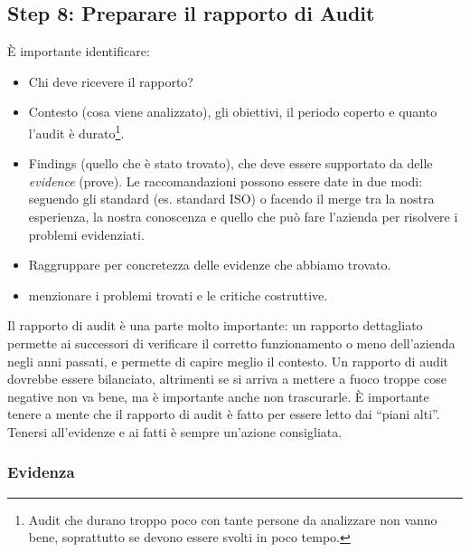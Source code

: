 \subsection{Step 8: Preparare il rapporto di Audit}

È importante identificare:
\begin{itemize}
\item Chi deve ricevere il rapporto?
\item Contesto (cosa viene analizzato), gli obiettivi, il periodo coperto e
quanto l'audit è durato\footnote{Audit che durano troppo poco con tante persone
da analizzare non vanno bene, soprattutto se devono essere svolti in poco
tempo.}.
\item Findings (quello che è stato trovato), che deve essere supportato da delle
\emph{evidence} (prove). Le raccomandazioni possono essere date in due modi:
seguendo gli standard (es. standard ISO) o facendo il merge tra la nostra
esperienza, la nostra conoscenza e quello che può fare l'azienda per risolvere i
problemi evidenziati.
\item Raggruppare per concretezza delle evidenze che abbiamo trovato.
\item menzionare i problemi trovati e le critiche costruttive.
\end{itemize}

Il rapporto di audit è una parte molto importante: un rapporto dettagliato
permette ai successori di verificare il corretto funzionamento o meno
dell'azienda negli anni passati, e permette di capire meglio il contesto. Un
rapporto di audit dovrebbe essere bilanciato, altrimenti se si arriva a mettere
a fuoco troppe cose negative non va bene, ma è importante anche non trascurarle.
È importante tenere a mente che il rapporto di audit è fatto per essere letto
dai ``piani alti''. Tenersi all'evidenze e ai fatti è sempre un'azione
consigliata.






\subsubsection{Evidenza}

